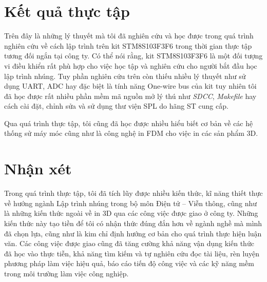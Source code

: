 \section{Kết quả thực tập}
Trên đây là những lý thuyết mà tôi đã nghiên cứu và học được trong quá trình nghiên cứu về cách lập trình trên kit STM8S103F3F6 trong thời gian thực tập tương đối ngắn tại công ty.
Có thể nói rằng, kit STM8S103F3F6 là một đối tượng vi điều khiển rất phù hợp cho việc học tập và nghiên cứu cho người bắt đầu học lập trình nhúng.
Tuy phần nghiên cứu trên còn thiếu nhiều lý thuyết như sử dụng UART, ADC hay đặc biệt là tính năng One-wire bus của kit tuy nhiên tôi đã học được rất nhiều phần mềm mã nguồn mở lý thú như \emph{SDCC}, \emph{Makefile} hay cách cài đặt, chỉnh sửa và sử dụng thư viện SPL do hãng ST cung cấp.

Qua quá trình thực tập, tôi cũng đã học được nhiều hiểu biết cơ bản về các hệ thống sử máy móc cũng như là công nghệ in FDM cho việc in các sản phẩm 3D.
\section{Nhận xét}
Trong quá trình thực tập, tôi đã tích lũy được nhiều kiến thức, kĩ năng thiết thực về hướng ngành Lập trình nhúng trong bộ môn Điện tử -- Viễn thông, cũng như là những kiến thức ngoài về in 3D qua các công việc được giao ở công ty.
Những kiến thức này tạo tiền để tôi có nhận thức đúng đắn hơn về ngành nghề mà mình đã chọn lựa, cũng như là kim chỉ định hướng cơ bản cho quá trình thực hiện luận văn.
Các công việc được giao cũng đã tăng cường khả năng vận dụng kiến thức đã học vào thực tiễn, khả năng tìm kiếm và tự nghiên cứu đọc tài liệu, rèn luyện phương pháp làm việc hiệu quả, báo cáo tiến độ công việc và các kỹ năng mềm trong môi trường làm việc công nghiệp.
